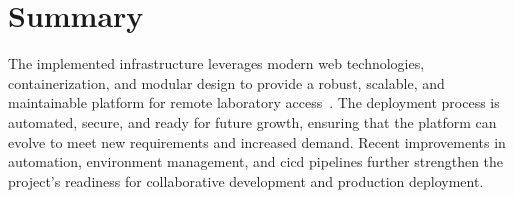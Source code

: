 \section{Summary}

The implemented infrastructure leverages modern web technologies, containerization, and modular design to provide a robust, scalable, and maintainable platform for remote laboratory access~\cite{nextjs-docs,docker-docs}. The deployment process is automated, secure, and ready for future growth, ensuring that the platform can evolve to meet new requirements and increased demand. Recent improvements in automation, environment management, and \ac{cicd} pipelines further strengthen the project's readiness for collaborative development and production deployment.